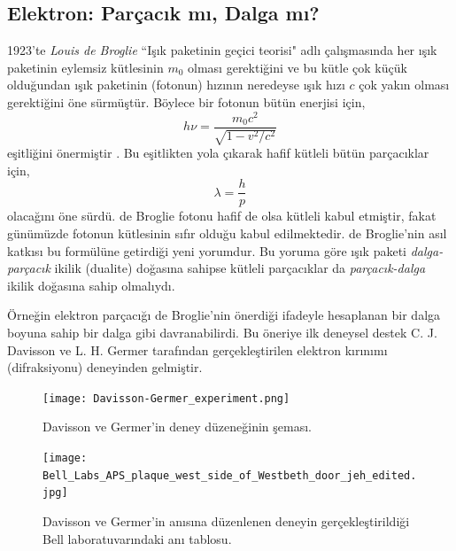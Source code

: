 \documentclass[a4paper,12pt, twoside]{article}
\begin{document}
\newpage

\subsection{Elektron: Parçacık mı, Dalga mı?}

1923'te {\it Louis de Broglie} ``Işık paketinin geçici teorisi" adlı çalışmasında her ışık paketinin eylemsiz kütlesinin $m_0$ olması gerektiğini ve
bu kütle çok küçük olduğundan ışık paketinin (fotonun) hızının neredeyse ışık hızı $c$ çok yakın olması gerektiğini öne sürmüştür. Böylece bir fotonun bütün enerjisi için,
\begin{equation}
\label{eq:foton_deBroglie_E}
h \nu = \frac{m_0 c^2}{\sqrt{1-v^2/c^2}}
\end{equation}
eşitliğini önermiştir \cite{book:FrenchAP}. Bu eşitlikten yola çıkarak hafif kütleli bütün parçacıklar için,
\begin{equation}
\label{eq:deBroglie_P}
\lambda = \frac{h}{p}
\end{equation}
olacağını öne sürdü. de Broglie fotonu hafif de olsa kütleli kabul etmiştir, fakat günümüzde fotonun kütlesinin sıfır olduğu kabul edilmektedir. de Broglie'nin asıl katkısı bu formülüne getirdiği yeni yorumdur. Bu yoruma göre ışık paketi {\it dalga-parçacık} ikilik (dualite) doğasına sahipse kütleli parçacıklar da {\it parçacık-dalga} ikilik doğasına sahip olmalıydı. 

Örneğin elektron parçacığı de Broglie'nin önerdiği ifadeyle hesaplanan bir dalga boyuna sahip bir dalga gibi davranabilirdi. Bu öneriye ilk deneysel destek C. J. Davisson ve L. H. Germer tarafından gerçekleştirilen elektron kırınımı (difraksiyonu) deneyinden gelmiştir. 

\begin{figure}[hbtp]
\center
\begin{minipage}{0.45\textwidth}
\texttt{[image: Davisson-Germer\_experiment.png]}
\caption{Davisson ve Germer'in deney düzeneğinin şeması\cite{web:wiki_davisson_germer1}.}
\label{fig:davisson_germer1}
\end{minipage}
\hspace{24pt}
\begin{minipage}{0.45\textwidth}
\texttt{[image: Bell\_Labs\_APS\_plaque\_west\_side\_of\_Westbeth\_door\_jeh\_edited.jpg]}
\caption{Davisson ve Germer'in anısına düzenlenen deneyin gerçekleştirildiği Bell laboratuvarındaki anı tablosu\cite{web:wiki_davisson_germer1}.}
\label{fig:davisson_germer2}
\end{minipage}
\end{figure}
\end{document}
